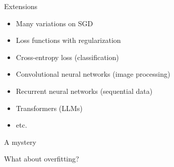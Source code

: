 \begin{frame}{Extensions}


    \begin{itemize}
        \item Many variations on SGD
        \vspace{0.5em}
        \item Loss functions with regularization
        \vspace{0.5em}
        \item Cross-entropy loss (classification)
        \vspace{0.5em}
        \item Convolutional neural networks (image processing)
        \vspace{0.5em}
        \item Recurrent neural networks (sequential data)
        \vspace{0.5em}
        \item Transformers (LLMs)
        \vspace{0.5em}
        \item etc.
    \end{itemize}
    
\end{frame}



\begin{frame}{A mystery}
    
    What about overfitting?

\end{frame}

\begin{frame}
    
    \begin{figure}
       \centering
    \end{figure}

\end{frame}

